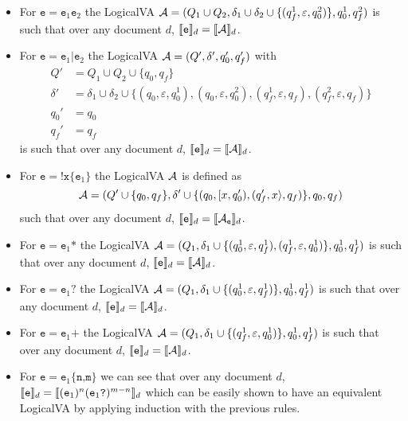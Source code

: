 \begin{itemize}
	\item For $\texttt{e} = \texttt{e}_1\texttt{e}_2$ the LogicalVA $\mathcal{A} = (Q_1 \cup Q_2, \delta_1 \cup \delta_2 \cup \{(q_f^1, \varepsilon, q_0^2)\}, q_0^1, q_f^2)$ is such that over any document $d$, $\llbracket\texttt{e}\rrbracket_d = \llbracket\mathcal{A}\rrbracket_d$.
	\item For $\texttt{e} = \texttt{e}_1\texttt{|}\texttt{e}_2$ the LogicalVA $\mathcal{A} = (Q', \delta', q_0', q_f')$ with
	      \begin{align*}
		      Q'      & = Q_1 \cup Q_2 \cup \{q_0, q_f\}                                                                                                              \\
		      \delta' & = \delta_1 \cup \delta_2 \cup \{(q_0, \varepsilon, q_0^1), (q_0, \varepsilon, q_0^2), (q_f^1, \varepsilon, q_f), (q_f^2, \varepsilon, q_f) \} \\
		      q_0'    & = q_0                                                                                                                                         \\
		      q_f'    & = q_f
	      \end{align*}
	      is such that over any document $d$, $\llbracket\texttt{e}\rrbracket_d = \llbracket\mathcal{A}\rrbracket_d$.
	\item For $\texttt{e} = \texttt{!x\{}\texttt{e}_1\texttt{\}}$ the LogicalVA $\mathcal{A}$ is defined as
	      \[
		      \mathcal{A} = (Q' \cup \{q_0, q_f\},\delta' \cup \{(q_0, [x, q_0'), (q_f', x\rangle, q_f)\}, q_0, q_f)
	      \]
	      such that over any document $d$, $\llbracket\texttt{e}\rrbracket_d = \llbracket\mathcal{A}_\texttt{e}\rrbracket_d$.
	\item For $\texttt{e} = \texttt{e}_1\texttt{*}$ the LogicalVA $\mathcal{A} = (Q_1, \delta_1 \cup \{(q_0^1, \varepsilon, q_f^1), (q_f^1, \varepsilon, q_0^1)\}, q_0^1, q_f^1)$ is such that over any document $d$, $\llbracket\texttt{e}\rrbracket_d = \llbracket\mathcal{A}\rrbracket_d$.
	\item For $\texttt{e} = \texttt{e}_1\texttt{?}$ the LogicalVA $\mathcal{A} = (Q_1, \delta_1 \cup \{(q_0^1, \varepsilon, q_f^1)\}, q_0^1, q_f^1)$ is such that over any document $d$, $\llbracket\texttt{e}\rrbracket_d = \llbracket\mathcal{A}\rrbracket_d$.
	\item For $\texttt{e} = \texttt{e}_1\texttt{+}$ the LogicalVA $\mathcal{A} = (Q_1, \delta_1 \cup \{(q_f^1, \varepsilon, q_0^1)\}, q_0^1, q_f^1)$ is such that over any document $d$, $\llbracket\texttt{e}\rrbracket_d = \llbracket\mathcal{A}\rrbracket_d$.
	\item For $\texttt{e} = \texttt{e}_1\texttt{\{n,m\}}$ we can see that over any document $d$, $\llbracket\texttt{e}\rrbracket_d = \llbracket(\texttt{e}_1)^n(\texttt{e}_1\texttt{?})^{m-n}\rrbracket_d$ which can be easily shown to have an equivalent LogicalVA by applying induction with the previous rules.
\end{itemize}